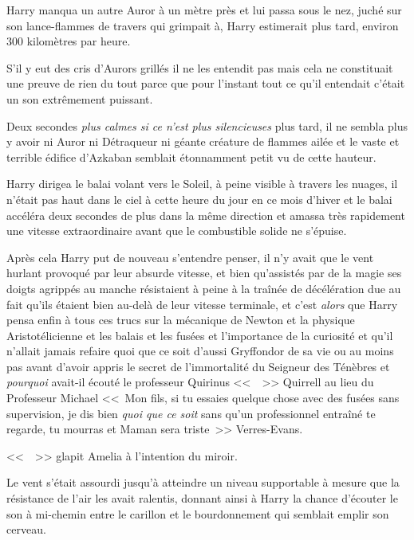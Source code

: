 Harry manqua un autre Auror à un mètre près et lui passa sous le nez, juché sur son lance-flammes de travers qui grimpait à, Harry estimerait plus tard, environ 300 kilomètres par heure.

S'il y eut des cris d'Aurors grillés il ne les entendit pas mais cela ne constituait une preuve de rien du tout parce que pour l'instant tout ce qu'il entendait c'était un son extrêmement puissant.

Deux secondes \emph{plus calmes si ce n'est plus silencieuses} plus tard, il ne sembla plus y avoir ni Auror ni Détraqueur ni géante créature de flammes ailée et le vaste et terrible édifice d'Azkaban semblait étonnamment petit vu de cette hauteur.

Harry dirigea le balai volant vers le Soleil, à peine visible à travers les nuages, il n'était pas haut dans le ciel à cette heure du jour en ce mois d'hiver et le balai accéléra deux secondes de plus dans la même direction et amassa très rapidement une vitesse extraordinaire avant que le combustible solide ne s'épuise.

Après cela Harry put de nouveau s'entendre penser, il n'y avait que le vent hurlant provoqué par leur absurde vitesse, et bien qu'assistés par de la magie ses doigts agrippés au manche résistaient à peine à la traînée de décélération due au fait qu'ils étaient bien au-delà de leur vitesse terminale, et c'est \emph{alors} que Harry pensa enfin à tous ces trucs sur la mécanique de Newton et la physique Aristotélicienne et les balais et les fusées et l'importance de la curiosité et qu'il n'allait jamais refaire quoi que ce soit d'aussi Gryffondor de sa vie ou au moins pas avant d'avoir appris le secret de l'immortalité du Seigneur des Ténèbres et \emph{pourquoi} avait-il écouté le professeur Quirinus <<~~>> Quirrell au lieu du Professeur Michael <<~Mon fils, si tu essaies quelque chose avec des fusées sans supervision, je dis bien \emph{quoi que ce soit} sans qu'un professionnel entraîné te regarde, tu mourras et Maman sera triste~>> Verres-Evans.

\later

<<~~>> glapit Amelia à l'intention du miroir.

\later

Le vent s'était assourdi jusqu'à atteindre un niveau supportable à mesure que la résistance de l'air les avait ralentis, donnant ainsi à Harry la chance d'écouter le son à mi-chemin entre le carillon et le bourdonnement qui semblait emplir son cerveau.

